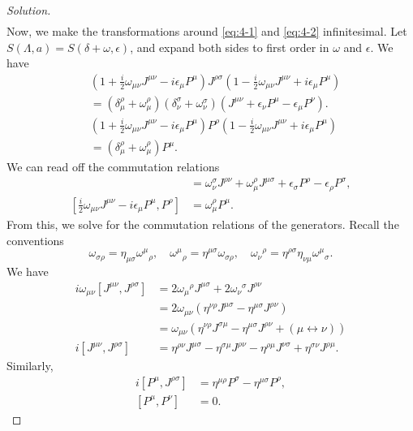 \begin{proof}[Solution]
\begin{align}
	\end{align}
	Now, we make the transformations around \eqref{eq:4-1} and \eqref{eq:4-2} infinitesimal. Let $S(\Lambda, a) = S(\delta + \omega, \epsilon)$, and expand both sides to first order in $\omega$ and $\epsilon$. We have
	\begin{align*}
		&\left(1 + \frac{i}{2} \omega_{\mu \nu} J^{\mu \nu} - i \epsilon_\mu P^\mu\right) J^{\rho \sigma} \left(1 - \frac{i}{2} \omega_{\mu \nu} J^{\mu \nu} + i \epsilon_\mu P^\mu\right)\\
		&= (\delta^\rho _ \mu + \omega^\rho _ \mu)(\delta^\sigma _ \nu + \omega^\sigma _ \nu) \left(J^{\mu \nu} + \epsilon_\nu P^\mu - \epsilon_\mu P^\nu\right).\\
		&\left(1 + \frac{i}{2} \omega_{\mu \nu} J^{\mu \nu} - i \epsilon_\mu P^\mu\right) P^\rho \left(1 - \frac{i}{2} \omega_{\mu \nu} J^{\mu \nu} + i \epsilon_\mu P^\mu\right) \\
		&= (\delta^\rho _ \mu + \omega^\rho _ \mu) P^\mu.
	\end{align*}
	We can read off the commutation relations
	\begin{align*}
		[\frac{i}{2} \omega_{\mu \nu} J^{\mu \nu} - i \epsilon_\mu P^\mu, J^{\rho \sigma}]
		&= \omega^\sigma _ \nu J^{\rho \nu} + \omega^\rho _ \mu J^{\mu \sigma} + \epsilon_\sigma P^\rho - \epsilon_\rho P^\sigma,\\
		[\frac{i}{2} \omega_{\mu \nu} J^{\mu \nu} - i \epsilon_\mu P^\mu, P^\rho]
		&= \omega^\rho _ \mu P^\mu.
	\end{align*}
	From this, we solve for the commutation relations of the generators. Recall the conventions
	\[
	\omega_{\sigma \rho} = \eta_{\mu \sigma} {\omega^\mu} _ \rho, \quad {\omega^\mu}_ \rho = \eta^{\mu \sigma} \omega_{\sigma \rho}, \quad {\omega_\nu} ^\rho = \eta^{\rho \sigma} \eta_{\nu \mu} {\omega^\mu} _ \sigma.
	\]
	We have
	\begin{align*}
		i \omega_{\mu \nu} [J^{\mu \nu}, J^{\rho \sigma}]
		&= 2 {\omega_\mu} ^\rho J^{\mu \sigma} + 2 {\omega_\nu} ^\sigma J^{\rho \nu}\\
		&= 2 \omega_{\mu \nu} \left(\eta^{\nu \rho} J^{\mu \sigma} - \eta^{\mu \sigma} J^{\rho \nu}\right)\\
		&= \omega_{\mu \nu}
			\left(\eta^{\nu \rho} J^{\sigma \mu} - \eta^{\mu \sigma} J^{\rho \nu} + (\mu \leftrightarrow \nu)\right) \\
		i [J^{\mu \nu}, J^{\rho \sigma}]
		&= \eta^{\rho \nu} J^{\mu \sigma} - \eta^{\sigma \mu} J^{\rho \nu} - \eta^{\rho \mu} J^{\nu \sigma} + \eta^{\sigma \nu} J^{\rho \mu}.
	\end{align*}
	Similarly,
	\begin{align*}
		i[P^\mu, J^{\rho \sigma}] 
		&= \eta^{\mu \rho} P^\sigma - \eta^{\mu \sigma} P^\rho,\\
		[P^\mu, P^\nu] &= 0.
	\end{align*}


\end{proof}
